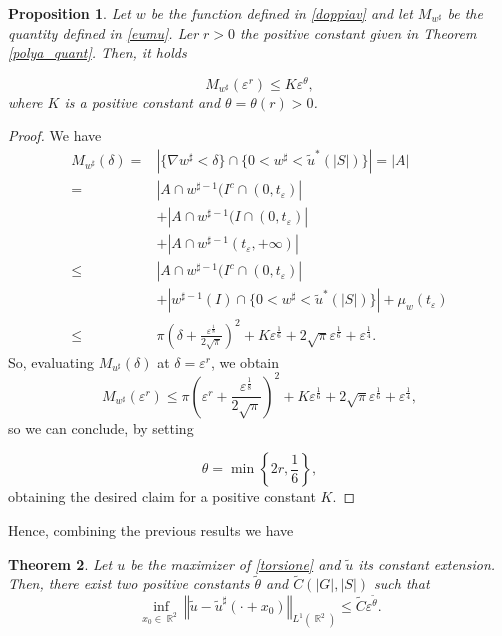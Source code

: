 \documentclass[oneside,a4paper,11pt,notitlepage]{article}
\newcommand{\abs}[1]{{\left|#1\right|}}
\newcommand{\norma}[1]{{\left\Vert#1\right\Vert}}
\theoremstyle{definition}
\theoremstyle{plain}
\newtheorem{theorem}{Theorem}[section]
\newtheorem{prop}[theorem]{Proposition}
\theoremstyle{definition}
\DeclareMathOperator{\R}{\mathbb{R}}
\begin{document}
 \begin{prop}\label{Musharp}
 Let $w$ be the function defined in \eqref{doppiav} and let $M_{w^\sharp}$ be the quantity defined in \eqref{eumu}. Ler $r>0$ the positive constant given in Theorem \ref{polya_quant}. Then,  it holds
    
   $$ M_{w^\sharp}(\varepsilon^r)\leq K\varepsilon^{\theta},$$
   where $K$ is a positive constant and $\theta=\theta(r)>0$.
\end{prop}
\begin{proof}
We have 
\begin{align*}
   M_{w^\sharp}(\delta) =& \abs{\{\nabla w^\sharp < \delta\} \cap \{0 <w^\sharp < {\tilde u}^\ast(\abs{S})\}} = \abs{A} \\=&\abs{A\cap w^{\sharp-1}(I^c\cap (0,t_{\varepsilon})}\\
    &+\abs{A\cap w^{\sharp-1}(I\cap (0,t_{\varepsilon})}\\
    &+\abs{A\cap w^{\sharp-1}(t_{\varepsilon}, +\infty)}\\
    \leq &\abs{A\cap w^{\sharp-1}(I^c\cap (0,t_{\varepsilon})}
\\
&+\abs{w^{\sharp-1}(I) \cap \{0 <w^\sharp < {\tilde u}^\ast(\abs{S})\}}  
 +\mu_w(t_{\varepsilon}) 
\\ \leq &\pi\left(\delta+\frac{\varepsilon^{\frac18}}{2\sqrt{\pi}}\right)^2 + K \varepsilon^{\frac16}+2\sqrt{\pi}\varepsilon^{\frac16}+ \varepsilon^{\frac14}.
\end{align*}
  So, evaluating $M_{u^\sharp}(\delta)$ at $\delta=\varepsilon^r$, we obtain
  $$M_{w^\sharp}(\varepsilon^r)\leq \pi\left(\varepsilon^r+\frac{\varepsilon^{\frac18}}{2\sqrt{\pi}}\right)^2 + K \varepsilon^{\frac16}+{2\sqrt{\pi}}\varepsilon^{\frac 16} + \varepsilon^{\frac14},$$
 so we can conclude, by setting

 $$\theta=\min\left\{ 2r, \frac 16 \right\},$$
obtaining the desired claim for a positive constant $K$.
\end{proof}
Hence, combining the previous results we have
\begin{theorem}
\label{anellia}
    Let $u$ be the maximizer of \eqref{torsione} and $\tilde u$ its constant extension. Then, there exist two positive constants $\tilde \theta$  and $\tilde C(\abs{G},\abs{S})$ such that
    \[
    \inf_{x_0\in\R^2}\norma{\tilde u-\tilde u^\sharp(\cdot+x_0)}_{L^1(\R^2)}\leq\tilde C\varepsilon^{\tilde \theta}.
    \]
\end{theorem}
\end{document}
